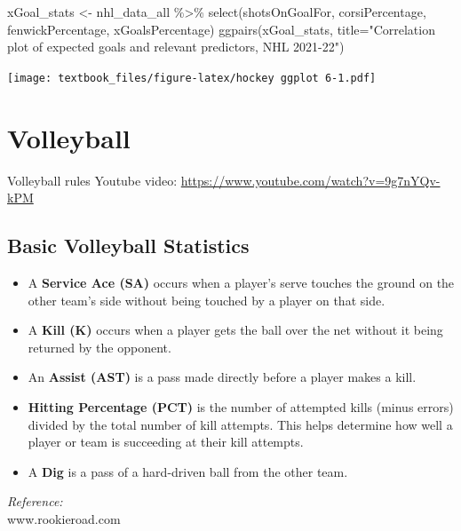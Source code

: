 \documentclass[
  11pt,
]{book}
\newenvironment{Shaded}{\begin{snugshade}}{\end{snugshade}}
\newcommand{\AttributeTok}[1]{\textcolor[rgb]{0.77,0.63,0.00}{#1}}
\newcommand{\FunctionTok}[1]{\textcolor[rgb]{0.00,0.00,0.00}{#1}}
\newcommand{\NormalTok}[1]{#1}
\newcommand{\OtherTok}[1]{\textcolor[rgb]{0.56,0.35,0.01}{#1}}
\newcommand{\SpecialCharTok}[1]{\textcolor[rgb]{0.00,0.00,0.00}{#1}}
\newcommand{\StringTok}[1]{\textcolor[rgb]{0.31,0.60,0.02}{#1}}
\providecommand{\tightlist}{%
  \setlength{\itemsep}{0pt}\setlength{\parskip}{0pt}}
\theoremstyle{definition}
\theoremstyle{definition}
\theoremstyle{definition}
\theoremstyle{definition}
\theoremstyle{remark}
\begin{document}
\begin{Shaded}
\begin{Highlighting}[]
\NormalTok{xGoal\_stats }\OtherTok{\textless{}{-}}\NormalTok{ nhl\_data\_all }\SpecialCharTok{\%\textgreater{}\%} 
  \FunctionTok{select}\NormalTok{(shotsOnGoalFor, corsiPercentage, fenwickPercentage, xGoalsPercentage)}
\FunctionTok{ggpairs}\NormalTok{(xGoal\_stats,}
        \AttributeTok{title=}\StringTok{"Correlation plot of expected goals and relevant predictors, NHL 2021{-}22"}\NormalTok{)}
\end{Highlighting}
\end{Shaded}

\texttt{[image: textbook\_files/figure-latex/hockey ggplot 6-1.pdf]}

\newpage

\hypertarget{volleyball}{%
\section{Volleyball}\label{volleyball}}

Volleyball rules Youtube video: \url{https://www.youtube.com/watch?v=9g7nYQv-kPM}

\hypertarget{basic-volleyball-statistics}{%
\subsection{Basic Volleyball Statistics}\label{basic-volleyball-statistics}}

\begin{itemize}
\tightlist
\item
  A \textbf{Service Ace (SA)} occurs when a player's serve touches the ground on the other team's side without being touched by a player on that side.
\item
  A \textbf{Kill (K)} occurs when a player gets the ball over the net without it being returned by the opponent.
\item
  An \textbf{Assist (AST)} is a pass made directly before a player makes a kill.
\item
  \textbf{Hitting Percentage (PCT)} is the number of attempted kills (minus errors) divided by the total number of kill attempts. This helps determine how well a player or team is succeeding at their kill attempts.
\item
  A \textbf{Dig} is a pass of a hard-driven ball from the other team.
\end{itemize}

\emph{Reference:}\\
www.rookieroad.com
\end{document}
